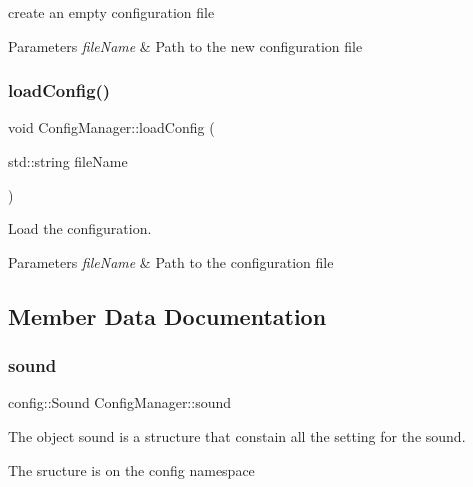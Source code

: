create an empty configuration file 


\begin{DoxyParams}{Parameters}
{\em file\+Name} & Path to the new configuration file \\
\hline
\end{DoxyParams}
\mbox{\label{classConfigManager_aabe7403d71337e1984dff31f450c413b}} 
\subsubsection{\texorpdfstring{load\+Config()}{loadConfig()}}
{\footnotesize\ttfamily void Config\+Manager\+::load\+Config (\begin{DoxyParamCaption}\item[{std\+::string}]{file\+Name }\end{DoxyParamCaption})}



Load the configuration. 


\begin{DoxyParams}{Parameters}
{\em file\+Name} & Path to the configuration file \\
\hline
\end{DoxyParams}


\subsection{Member Data Documentation}
\mbox{\label{classConfigManager_a010e2da02ebc90d7ce930d1c57a79e96}} 
\subsubsection{\texorpdfstring{sound}{sound}}
{\footnotesize\ttfamily config\+::\+Sound Config\+Manager\+::sound}



The object sound is a structure that constain all the setting for the sound. 

The sructure is on the config namespace \mbox{\label{classConfigManager_a1e0dbb8563b71871e6c68abce5620cd0}} 
